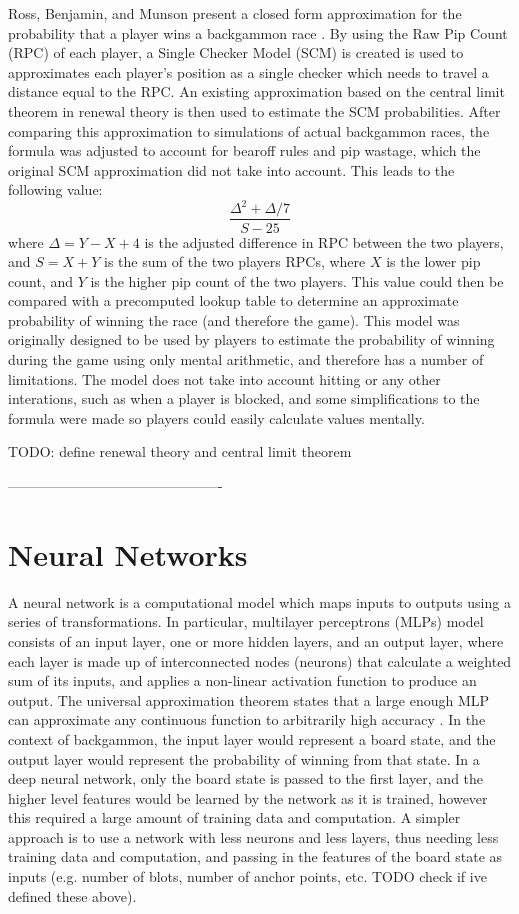 Ross, Benjamin, and Munson present a closed form approximation for the probability that a player wins a backgammon race \cite{estimating}.
By using the Raw Pip Count (RPC) of each player, a Single Checker Model (SCM) is created is used to approximates each player's position as a single checker which needs to travel a distance equal to the RPC.
An existing approximation based on the central limit theorem in renewal theory is then used to estimate the SCM probabilities. 
After comparing this approximation to simulations of actual backgammon races, the formula was adjusted to account for bearoff rules and pip wastage, which the original SCM approximation did not take into account. This leads to the following value:
$$
\frac{\Delta^2 + \Delta / 7}{S - 25}
$$
where $\Delta = Y - X + 4$ is the adjusted difference in RPC between the two players, and $S = X + Y$ is the sum of the two players RPCs, where $X$ is the lower pip count, and $Y$ is the higher pip count of the two players. 
This value could then be compared with a precomputed lookup table to determine an approximate probability of winning the race (and therefore the game). 
This model was originally designed to be used by players to estimate the probability of winning during the game using only mental arithmetic, and therefore has a number of limitations. The model does not take into account hitting or any other interations, such as when a player is blocked, and some simplifications to the formula were made so players could easily calculate values mentally. 


TODO: define renewal theory and central limit theorem

----------------------------------------------
\section{Neural Networks} 

A neural network is a computational model which maps inputs to outputs using a series of transformations.
In particular, multilayer perceptrons (MLPs) model consists of an input layer, one or more hidden layers, and an output layer, where each layer is made up of interconnected nodes (neurons) that calculate a weighted sum of its inputs, and applies a non-linear activation function to produce an output. 
The universal approximation theorem states that a large enough MLP can approximate any continuous function to arbitrarily high accuracy \cite{Hornik1989}.
In the context of backgammon, the input layer would represent a board state, and the output layer would represent the probability of winning from that state.
In a deep neural network, only the board state is passed to the first layer, and the higher level features would be learned by the network as it is trained, however this required a large amount of training data and computation. 
A simpler approach is to use a network with less neurons and less layers, thus needing less training data and computation, and passing in the features of the board state as inputs (e.g. number of blots, number of anchor points, etc. TODO check if ive defined these above).

